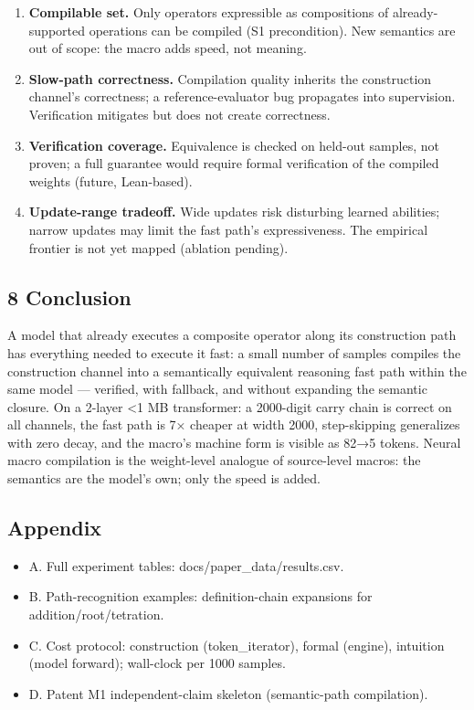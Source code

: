 \documentclass[
]{article}
\providecommand{\tightlist}{%
  \setlength{\itemsep}{0pt}\setlength{\parskip}{0pt}}
\begin{document}
\begin{enumerate}
\def\labelenumi{\arabic{enumi}.}
\tightlist
\item
  \textbf{Compilable set.} Only operators expressible as compositions of
  already-supported operations can be compiled (S1 precondition). New
  semantics are out of scope: the macro adds speed, not meaning.
\item
  \textbf{Slow-path correctness.} Compilation quality inherits the
  construction channel's correctness; a reference-evaluator bug
  propagates into supervision. Verification mitigates but does not
  create correctness.
\item
  \textbf{Verification coverage.} Equivalence is checked on held-out
  samples, not proven; a full guarantee would require formal
  verification of the compiled weights (future, Lean-based).
\item
  \textbf{Update-range tradeoff.} Wide updates risk disturbing learned
  abilities; narrow updates may limit the fast path's expressiveness.
  The empirical frontier is not yet mapped (ablation pending).
\end{enumerate}

\subsection{8 Conclusion}\label{conclusion}

A model that already executes a composite operator along its
construction path has everything needed to execute it fast: a small
number of samples compiles the construction channel into a semantically
equivalent reasoning fast path within the same model --- verified, with
fallback, and without expanding the semantic closure. On a 2-layer
\textless1 MB transformer: a 2000-digit carry chain is correct on all
channels, the fast path is 7× cheaper at width 2000, step-skipping
generalizes with zero decay, and the macro's machine form is visible as
82→5 tokens. Neural macro compilation is the weight-level analogue of
source-level macros: the semantics are the model's own; only the speed
is added.

\subsection{Appendix}\label{appendix}

\begin{itemize}
\tightlist
\item
  A. Full experiment tables: docs/paper\_data/results.csv.
\item
  B. Path-recognition examples: definition-chain expansions for
  addition/root/tetration.
\item
  C. Cost protocol: construction (token\_iterator), formal (engine),
  intuition (model forward); wall-clock per 1000 samples.
\item
  D. Patent M1 independent-claim skeleton (semantic-path compilation).
\end{itemize}
\end{document}
